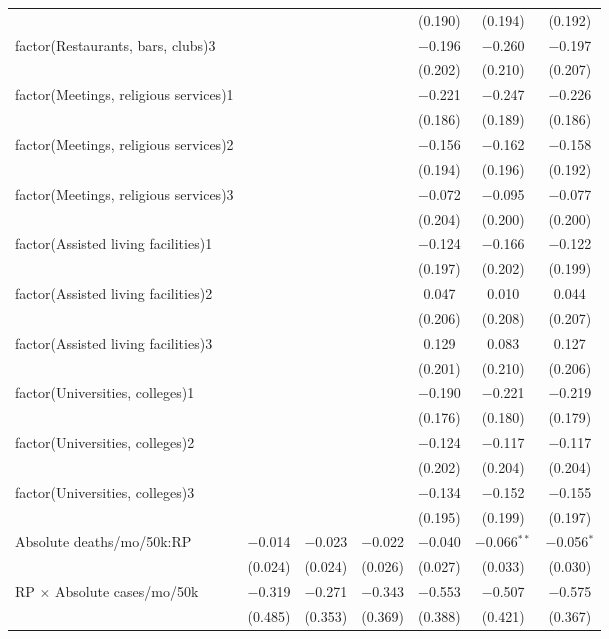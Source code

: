 \begin{table}[!htbp]
\begin{tabular}{@{\extracolsep{5pt}}lcccccc}
  &  &  &  & (0.190) & (0.194) & (0.192) \\ 
  factor(Restaurants, bars, clubs)3 &  &  &  & $-$0.196 & $-$0.260 & $-$0.197 \\ 
  &  &  &  & (0.202) & (0.210) & (0.207) \\ 
  factor(Meetings, religious services)1 &  &  &  & $-$0.221 & $-$0.247 & $-$0.226 \\ 
  &  &  &  & (0.186) & (0.189) & (0.186) \\ 
  factor(Meetings, religious services)2 &  &  &  & $-$0.156 & $-$0.162 & $-$0.158 \\ 
  &  &  &  & (0.194) & (0.196) & (0.192) \\ 
  factor(Meetings, religious services)3 &  &  &  & $-$0.072 & $-$0.095 & $-$0.077 \\ 
  &  &  &  & (0.204) & (0.200) & (0.200) \\ 
  factor(Assisted living facilities)1 &  &  &  & $-$0.124 & $-$0.166 & $-$0.122 \\ 
  &  &  &  & (0.197) & (0.202) & (0.199) \\ 
  factor(Assisted living facilities)2 &  &  &  & 0.047 & 0.010 & 0.044 \\ 
  &  &  &  & (0.206) & (0.208) & (0.207) \\ 
  factor(Assisted living facilities)3 &  &  &  & 0.129 & 0.083 & 0.127 \\ 
  &  &  &  & (0.201) & (0.210) & (0.206) \\ 
  factor(Universities, colleges)1 &  &  &  & $-$0.190 & $-$0.221 & $-$0.219 \\ 
  &  &  &  & (0.176) & (0.180) & (0.179) \\ 
  factor(Universities, colleges)2 &  &  &  & $-$0.124 & $-$0.117 & $-$0.117 \\ 
  &  &  &  & (0.202) & (0.204) & (0.204) \\ 
  factor(Universities, colleges)3 &  &  &  & $-$0.134 & $-$0.152 & $-$0.155 \\ 
  &  &  &  & (0.195) & (0.199) & (0.197) \\ 
  Absolute deaths/mo/50k:RP & $-$0.014 & $-$0.023 & $-$0.022 & $-$0.040 & $-$0.066$^{**}$ & $-$0.056$^{*}$ \\ 
  & (0.024) & (0.024) & (0.026) & (0.027) & (0.033) & (0.030) \\ 
  RP $\times$ Absolute cases/mo/50k & $-$0.319 & $-$0.271 & $-$0.343 & $-$0.553 & $-$0.507 & $-$0.575 \\ 
  & (0.485) & (0.353) & (0.369) & (0.388) & (0.421) & (0.367) \\ 

\end{tabular}
\end{table}
